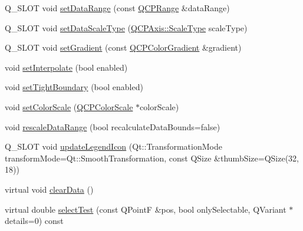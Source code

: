 \begin{DoxyCompactItemize}
\item 
Q\+\_\+\+S\+L\+OT void \hyperlink{class_q_c_p_color_map_a980b42837821159786a85b4b7dcb8774}{set\+Data\+Range} (const \hyperlink{class_q_c_p_range}{Q\+C\+P\+Range} \&data\+Range)
\item 
Q\+\_\+\+S\+L\+OT void \hyperlink{class_q_c_p_color_map_a9d20aa08e3c1f20f22908c45b9c06511}{set\+Data\+Scale\+Type} (\hyperlink{class_q_c_p_axis_a36d8e8658dbaa179bf2aeb973db2d6f0}{Q\+C\+P\+Axis\+::\+Scale\+Type} scale\+Type)
\item 
Q\+\_\+\+S\+L\+OT void \hyperlink{class_q_c_p_color_map_a7313c78360471cead3576341a2c50377}{set\+Gradient} (const \hyperlink{class_q_c_p_color_gradient}{Q\+C\+P\+Color\+Gradient} \&gradient)
\item 
void \hyperlink{class_q_c_p_color_map_a484eaa8a5065cfc386b15375bf98b964}{set\+Interpolate} (bool enabled)
\item 
void \hyperlink{class_q_c_p_color_map_ad03221cc285e5f562a0b13d684b5576d}{set\+Tight\+Boundary} (bool enabled)
\item 
void \hyperlink{class_q_c_p_color_map_aa828921db364fe3c6af4619580ab85fd}{set\+Color\+Scale} (\hyperlink{class_q_c_p_color_scale}{Q\+C\+P\+Color\+Scale} $\ast$color\+Scale)
\item 
void \hyperlink{class_q_c_p_color_map_a856608fa3dd1cc290bcd5f29a5575774}{rescale\+Data\+Range} (bool recalculate\+Data\+Bounds=false)
\item 
Q\+\_\+\+S\+L\+OT void \hyperlink{class_q_c_p_color_map_a5d8158b62d55fcfeaabcb68ce0083e87}{update\+Legend\+Icon} (Qt\+::\+Transformation\+Mode transform\+Mode=Qt\+::\+Smooth\+Transformation, const Q\+Size \&thumb\+Size=Q\+Size(32, 18))
\item 
virtual void \hyperlink{class_q_c_p_color_map_a0545dce5383766885912331705a8e099}{clear\+Data} ()
\item 
virtual double \hyperlink{class_q_c_p_color_map_aba91ea58b489031157ecb777fe79e309}{select\+Test} (const Q\+PointF \&pos, bool only\+Selectable, Q\+Variant $\ast$details=0) const
\end{DoxyCompactItemize}
